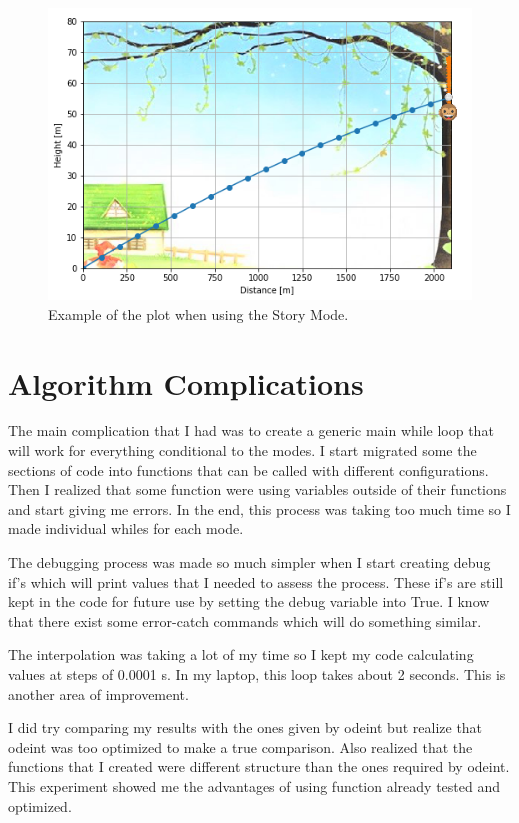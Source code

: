 \begin{figure}
    \centering
    \includegraphics{figures/StoryMode.PNG}
    \caption{Example of the plot when using the Story Mode.}
    \label{fig:StoryMode}
\end{figure}

\section{Algorithm Complications}

The main complication that I had was to create a generic main while loop that will work for everything conditional to the modes. I start migrated some the sections of code into functions that can be called with different configurations. Then I realized that some function were using variables outside of their functions and start giving me errors. In the end, this process was taking too much time so I made individual whiles for each mode. 

The debugging process was made so much simpler when I start creating debug if's which will print values that I needed to assess the process. These if's are still kept in the code for future use by setting the debug variable into True. I know that there exist some error-catch commands which will do something similar. 

The interpolation was taking a lot of my time so I kept my code calculating values at steps of 0.0001 s. In my laptop, this loop takes about 2 seconds. This is another area of improvement.

I did try comparing my results with the ones given by odeint but realize that odeint was too optimized to make a true comparison. Also realized that the functions that I created were different structure than the ones required by odeint. This experiment showed me the advantages of using function already tested and optimized. 
